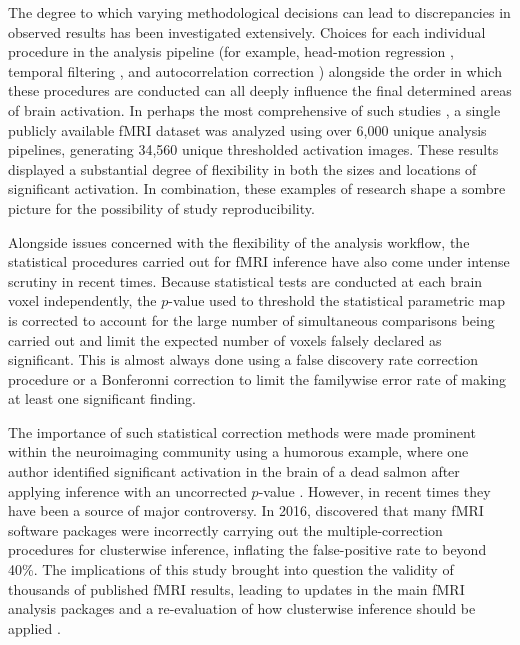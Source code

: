 The degree to which varying methodological decisions can lead to discrepancies in observed results has been investigated extensively. Choices for each individual procedure in the analysis pipeline (for example, head-motion regression \citep{Lund2005-sf}, temporal filtering \citep{Skudlarski1999-ao}, and autocorrelation correction \citep{Woolrich2001-tk}) alongside the order in which these procedures are conducted \citep{Carp2013-cm} can all deeply influence the final determined areas of brain activation. In perhaps the most comprehensive of such studies \citep{Carp2012-ph}, a single publicly available fMRI dataset was analyzed using over 6,000 unique analysis pipelines, generating 34,560 unique thresholded activation images. These results displayed a substantial degree of flexibility in both the sizes and locations of significant activation. In combination, these examples of research shape a sombre picture for the possibility of study reproducibility. 

Alongside issues concerned with the flexibility of the analysis workflow, the statistical procedures carried out for fMRI inference have also come under intense scrutiny in recent times. Because statistical tests are conducted at each brain voxel independently, the $p$-value used to threshold the statistical parametric map is corrected to account for the large number of simultaneous comparisons being carried out and limit the expected number of voxels falsely declared as significant. This is almost always done using a false discovery rate correction procedure \citep{Benjamini1995-yy} or a Bonferonni correction to limit the familywise error rate of making at least one significant finding. 

The importance of such statistical correction methods were made prominent within the neuroimaging community using a humorous example, where one author identified significant activation in the brain of a dead salmon after applying inference with an uncorrected $p$-value \citep{Bennett2009-fh}. However, in recent times they have been a source of major controversy. In 2016, \citet*{Eklund2016-ak} discovered that many fMRI software packages were incorrectly carrying out the multiple-correction procedures for clusterwise inference, inflating the false-positive rate to beyond 40\%. The implications of this study brought into question the validity of thousands of published fMRI results, leading to updates in the main fMRI analysis packages \citep{Cox2017-wr} and a re-evaluation of how clusterwise inference should be applied \citep{Flandin2019-qx, Mueller2017-pn, Cox2017-ys}. 

